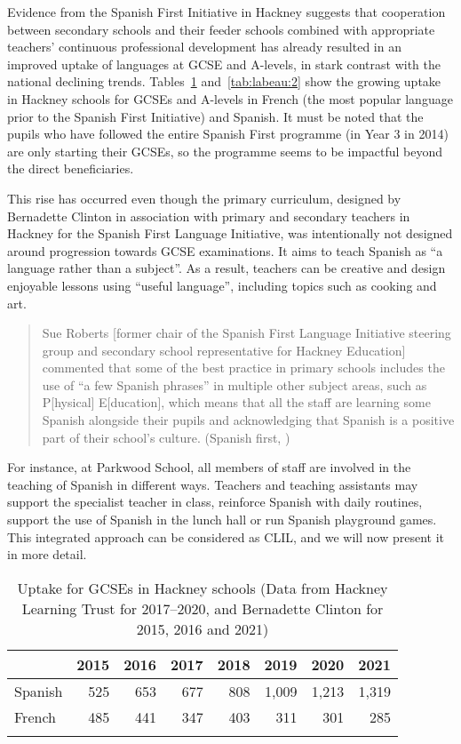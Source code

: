 \documentclass[output=paper]{langscibook}
\begin{document}
Evidence from the Spanish First Initiative in Hackney suggests that cooperation between secondary schools and their feeder schools combined with appropriate teachers’ continuous professional development has already resulted in an improved uptake of languages at GCSE and A-levels, in stark contrast with the national declining trends. Tables~\ref{tab:labeau:1} and~\ref{tab:labeau:2} show the growing uptake in Hackney schools for GCSEs and A-levels in French (the most popular language prior to the Spanish First Initiative) and Spanish. It must be noted that the pupils who have followed the entire Spanish First programme (in Year 3 in 2014) are only starting their GCSEs, so the programme seems to be impactful beyond the direct beneficiaries.

This rise has occurred even though the primary curriculum, designed by Bernadette Clinton in association with primary and secondary teachers in Hackney for the Spanish First Language Initiative, was intentionally not designed around progression towards GCSE examinations. It aims to teach Spanish as ``a language rather than a subject''. As a result, teachers can be creative and design enjoyable lessons using ``useful language'', including topics such as cooking and art.

\begin{quote}
Sue Roberts [former chair of the Spanish First Language Initiative steering group and secondary school representative for Hackney Education] commented that some of the best practice in primary schools includes the use of ``a few Spanish phrases'' in multiple other subject areas, such as P[hysical] E[ducation], which means that all the staff are learning some Spanish alongside their pupils and acknowledging that Spanish is a positive part of their school’s culture. (Spanish first, \citealt[10]{Baldwin2021})
\end{quote}

For instance, at Parkwood School, all members of staff are involved in the teaching of Spanish in different ways. Teachers and teaching assistants may support the specialist teacher in class, reinforce Spanish with daily routines, support the use of Spanish in the lunch hall or run Spanish playground games. This integrated approach can be considered as CLIL, and we will now present it in more detail.


\begin{table}
\caption{{\label{tab:labeau:1}Uptake for GCSEs in Hackney schools (Data from Hackney Learning Trust for 2017--2020, and Bernadette Clinton for 2015, 2016 and 2021)}}
\begin{tabular}{l *7{r}}
\lsptoprule
& {2015} & {2016} & {2017} & {2018} & {2019} & {2020} & {2021}\\
\midrule
Spanish & 525 & 653 & 677 & 808 & 1,009 & 1,213 & 1,319\\
French & 485 & 441 & 347 & 403 & 311 & 301 & 285\\
\lspbottomrule
\end{tabular}
\end{table}
\end{document}
